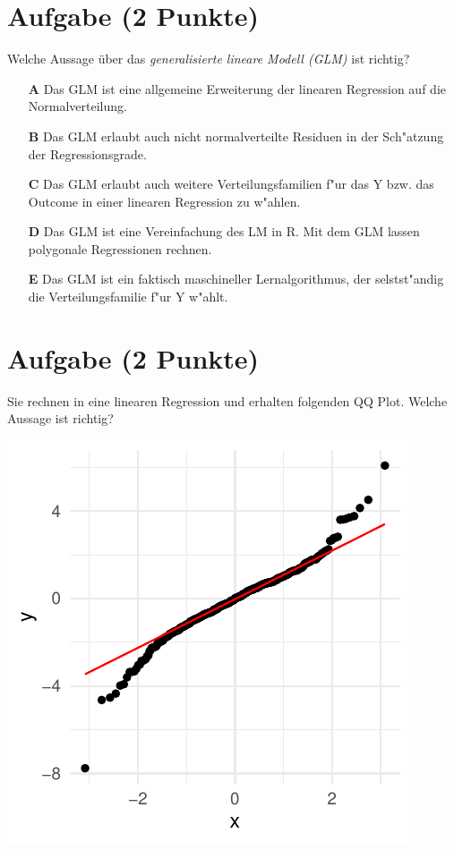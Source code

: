 \documentclass[a4paper, 10pt]{scrartcl}\usepackage[]{graphicx}\usepackage[]{xcolor}
\makeatletter
\def\maxwidth{ %
  \ifdim\Gin@nat@width>\linewidth
    \linewidth
  \else
    \Gin@nat@width
  \fi
}
\makeatother
\begin{document}
\section{Aufgabe \hfill (2 Punkte)}

Welche Aussage {\"u}ber das \textit{generalisierte lineare Modell (GLM)} ist richtig?  



\begin{enumerate}
\item [\textbf{A} \msquare] Das GLM ist eine allgemeine Erweiterung der linearen Regression auf die Normalverteilung.
\item [\textbf{B} \msquare] Das GLM erlaubt auch nicht normalverteilte Residuen in der Sch{"a}tzung der Regressionsgrade.
\item [\textbf{C} \msquare] Das GLM erlaubt auch weitere Verteilungsfamilien f{"u}r das Y bzw. das Outcome in einer linearen Regression zu w{"a}hlen.
\item [\textbf{D} \msquare] Das GLM ist eine Vereinfachung des LM in R. Mit dem GLM lassen polygonale Regressionen rechnen.
\item [\textbf{E} \msquare] Das GLM ist ein faktisch maschineller Lernalgorithmus, der selstst{"a}ndig die Verteilungsfamilie f{"u}r Y w{"a}hlt.
\end{enumerate}

\section{Aufgabe \hfill (2 Punkte)}

Sie rechnen in eine linearen Regression und erhalten folgenden QQ
Plot. Welche Aussage ist richtig?




{\centering \includegraphics[width=\maxwidth]{img/mc-regression-05-a-1} 

}
\end{document}
